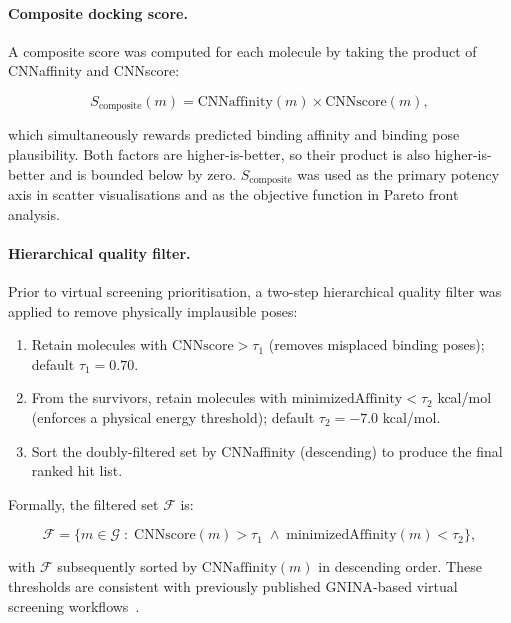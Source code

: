 \documentclass[a4paper,12pt]{article}
\begin{document}
\paragraph{Composite docking score.}
A composite score was computed for each molecule by taking the
product of CNNaffinity and CNNscore:
 
\begin{equation}
    S_{\mathrm{composite}}(m)
    = \text{CNNaffinity}(m) \times \text{CNNscore}(m),
    \label{eq:composite}
\end{equation}
 
\noindent which simultaneously rewards predicted binding affinity
and binding pose plausibility.
Both factors are higher-is-better, so their product is also
higher-is-better and is bounded below by zero.
$S_{\mathrm{composite}}$ was used as the primary potency axis
in scatter visualisations and as the objective function in
Pareto front analysis.
 
\paragraph{Hierarchical quality filter.}
Prior to virtual screening prioritisation, a two-step
hierarchical quality filter was applied to remove physically
implausible poses:
 
\begin{enumerate}
    \item Retain molecules with $\text{CNNscore} > \tau_1$
          (removes misplaced binding poses); default
          $\tau_1 = 0.70$.
    \item From the survivors, retain molecules with
          $\text{minimizedAffinity} < \tau_2$ kcal/mol
          (enforces a physical energy threshold); default
          $\tau_2 = -7.0$ kcal/mol.
    \item Sort the doubly-filtered set by CNNaffinity
          (descending) to produce the final ranked hit list.
\end{enumerate}
 
\noindent Formally, the filtered set $\mathcal{F}$ is:
 
\begin{equation}
    \mathcal{F} = \bigl\{
        m \in \mathcal{G} \;:\;
        \text{CNNscore}(m) > \tau_1 \;\wedge\;
        \text{minimizedAffinity}(m) < \tau_2
    \bigr\},
    \label{eq:hierarchical_filter}
\end{equation}
 
\noindent with $\mathcal{F}$ subsequently sorted by
$\text{CNNaffinity}(m)$ in descending order.
These thresholds are consistent with previously published
GNINA-based virtual screening workflows~\cite{mcnunn2021gnina}.
 
\end{document}

